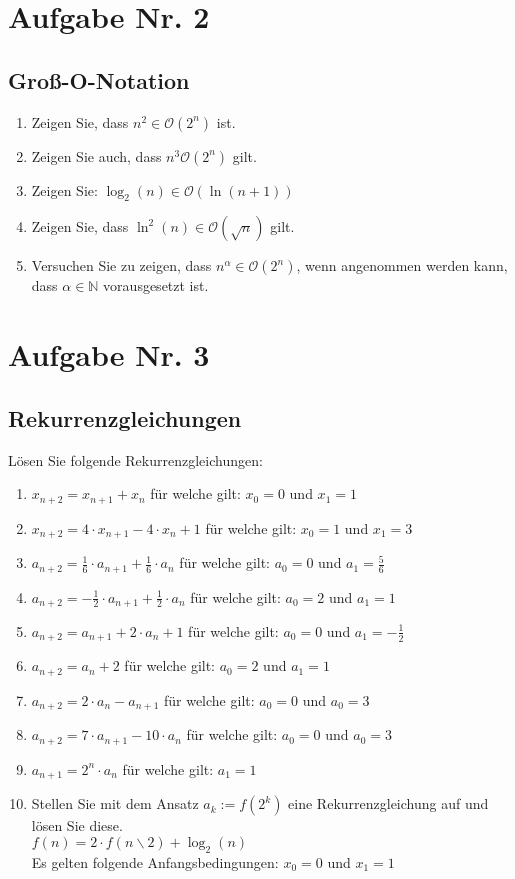\documentclass[12px,a4paper]{article}
\begin{document}
\newpage
\section*{Aufgabe Nr. 2}
\subsection*{Groß-O-Notation}
\begin{enumerate}
	\item Zeigen Sie, dass $n^2 \in \mathcal{O}(2^n)$ ist.
	\item Zeigen Sie auch, dass $n^3 \mathcal{O}(2^n)$ gilt.
	\item Zeigen Sie: $ \log_2(n) \in \mathcal{O}(\ln(n+1)) $
	
	\item Zeigen Sie, dass $\ln^2 (n) \in \mathcal{O}(\sqrt{n})$ gilt.
	\item Versuchen Sie zu zeigen, dass $n^{\alpha} \in \mathcal{O}(2^n)$, wenn angenommen werden kann, dass $\alpha \in \mathbb{N}$ vorausgesetzt ist.
\end{enumerate}
\newpage
\section*{Aufgabe Nr. 3}
\subsection*{Rekurrenzgleichungen}
Lösen Sie folgende Rekurrenzgleichungen: \\
\begin{enumerate}
	\item $x_{n+2}=x_{n+1} + x_n$ für welche gilt:	$x_0 = 0$ und $x_1 =1$
	\item $x_{n+2}=4 \cdot x_{n+1} - 4 \cdot x_n +1$ für welche gilt:	$x_0=1$ und $x_1=3$
	\item $a_{n+2} = \frac{1}{6} \cdot a_{n+1} + \frac{1}{6} \cdot a_n$ für welche gilt:	$a_0 = 0$ und $a_1 = \frac{5}{6}$
	\item $a_{n+2} = -\frac{1}{2} \cdot a_{n+1} + \frac{1}{2} \cdot a_n$ für welche gilt: $a_0 = 2$ und $a_1 = 1$
	\item $a_{n+2} = a_{n+1} + 2 \cdot a_n +1$ für welche gilt:	$a_0 = 0$ und $a_1 = - \frac{1}{2}$
	\item $a_{n+2} = a_n +2$ für welche gilt:	$a_0 = 2$ und $a_1 = 1$
	\item $a_{n+2} = 2 \cdot a_n - a_{n+1}$ für welche gilt:	$a_0 = 0$ und $a_0 = 3$
	\item $a_{n+2} = 7 \cdot a_{n+1} - 10 \cdot a_n$ für welche gilt:	$a_0 = 0$ und $a_0 = 3$
	\item $a_{n+1} = 2^n \cdot a_n$ für welche gilt: $a_1 = 1$
	\item Stellen Sie mit dem Ansatz $a_k := f(2^k)$ eine Rekurrenzgleichung auf und lösen Sie diese.\\ 
			\noindent\hspace*{5mm} $f(n) = 2 \cdot f(n\backslash 2) + \log_2(n)$ \\
			Es gelten folgende Anfangsbedingungen:	$x_0 = 0$ und $x_1 = 1$
\end{enumerate}
\newpage
\end{document}
